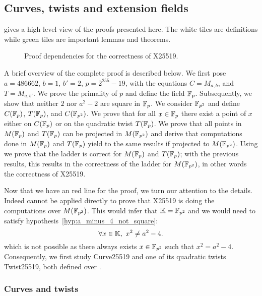 \subsection{Curves, twists and extension fields}
\label{subsec:curve_twist_fields}

 gives a high-level view of the proofs presented here.
The white tiles are definitions while green tiles are important lemmas and theorems.

\begin{figure}[h]
  \centering
  
  \caption{Proof dependencies for the correctness of X25519.}
  \label{tikz:ProofHighLevel2}
\end{figure}

A brief overview of the complete proof is described below.
We first pose $a = 486662$, $b = 1$, $b' = 2$, $p = 2^{255}-19$, with the equations $C = M_{a,b}$, and $T = M_{a,b'}$.
We prove the primality of $p$ and define the field $\mathbb{F}_{p}$.
Subsequently, we show that neither $2$ nor $a^2 - 2$ are square in $\mathbb{F}_{p}$.
We consider $\mathbb{F}_{p^2}$ and define $C(\mathbb{F}_{p})$, $T(\mathbb{F}_{p})$, and $C(\mathbb{F}_{p^2})$.
We prove that for all $x \in \mathbb{F}_{p}$ there exist a point of \xcoord $x$ either on $C(\mathbb{F}_{p})$ or on the quadratic twist $T(\mathbb{F}_{p})$.
We prove that all points in $M(\mathbb{F}_{p})$ and $T(\mathbb{F}_{p})$ can be projected in $M(\mathbb{F}_{p^2})$ and derive that computations done in $M(\mathbb{F}_{p})$ and $T(\mathbb{F}_{p})$ yield to the same results if projected to $M(\mathbb{F}_{p^2})$.
Using  we prove that the ladder is correct for $M(\mathbb{F}_{p})$ and $T(\mathbb{F}_{p})$; with the previous results, this results in the correctness of the ladder for $M(\mathbb{F}_{p^2})$, in other words the correctness of X25519.

Now that we have an red line for the proof, we turn our attention to the details.
Indeed  cannot be applied directly to prove that X25519 is
doing the computations over $M(\mathbb{F}_{p^2})$. This would infer that $\mathbb{K} = \mathbb{F}_{p^2}$ and we would need to satisfy
hypothesis~\ref{hyp:a_minus_4_not_square}:%
$$\forall x \in \mathbb{K},\ x^2 \neq a^2-4.$$
which is not possible as there always exists $x \in \mathbb{F}_{p^2}$ such that $x^2 = a^2-4$.
Consequently, we first study Curve25519 and one of its quadratic twists Twist25519,
both defined over .

\subsubsection{Curves and twists}
\label{subsec:Zmodp}

